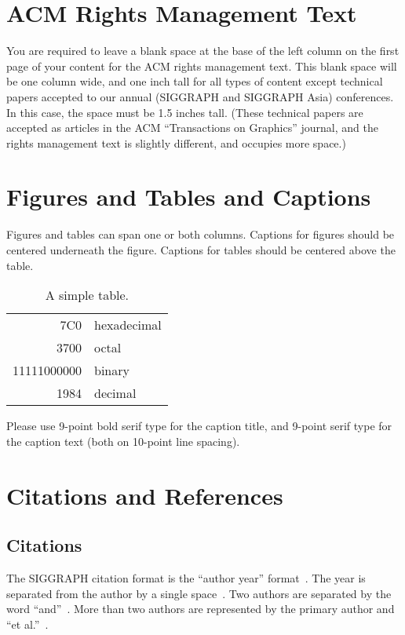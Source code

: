 \documentclass[tog]{acmsiggraph}
\begin{document}
\section{ACM Rights Management Text}

You are required to leave a blank space at the base of the left column
on the first page of your content for the ACM rights management
text. This blank space will be one column wide, and one inch tall for
all types of content except technical papers accepted to our annual
(SIGGRAPH and SIGGRAPH Asia) conferences. In this case, the space must
be 1.5 inches tall. (These technical papers are accepted as articles
in the ACM ``Transactions on Graphics'' journal, and the rights
management text is slightly different, and occupies more space.)

\section{Figures and Tables and Captions}

Figures and tables can span one or both columns. Captions for figures
should be centered underneath the figure. Captions for tables should
be centered above the table.

\begin{table}[ht]
  \centering
  \caption{A simple table.}
  \begin{tabular}{|r|l|}
    \hline
    7C0 & hexadecimal \\
    3700 & octal \\ \cline{2-2}
    11111000000 & binary \\
    \hline \hline
    1984 & decimal \\
    \hline
  \end{tabular}
\end{table}
  
Please use 9-point bold serif type for the caption title, and 9-point
serif type for the caption text (both on 10-point line spacing).

\section{Citations and References}

\subsection{Citations}

The SIGGRAPH citation format is the ``author year''
format~\cite{Pellacini:2005:LAH}. The year is separated from the
author by a single space~\cite{yee:2000:ssa}. Two authors are
separated by the word ``and''~\cite{parke:1996:CFA}. More than two
authors are represented by the primary author and ``et al.''~\cite{levoy:2000:TDM}.
\end{document}
